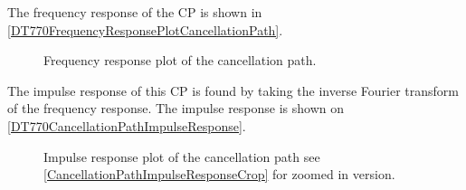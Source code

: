 %
%
%

The frequency response of the CP is shown in \autoref{DT770FrequencyResponsePlotCancellationPath}.

\begin{figure}[H]
	\centering
	
	\caption{Frequency response plot of the cancellation path.}
	\label{DT770FrequencyResponsePlotCancellationPath}
\end{figure}

The impulse response of this CP is found by taking the inverse Fourier transform of the frequency response.
The impulse response is shown on \autoref{DT770CancellationPathImpulseResponse}.

\begin{figure}[H]
	\centering
	
	\caption{Impulse response plot of the cancellation path see \autoref{CancellationPathImpulseResponseCrop} for zoomed in version.}
	\label{DT770CancellationPathImpulseResponse}
\end{figure}



